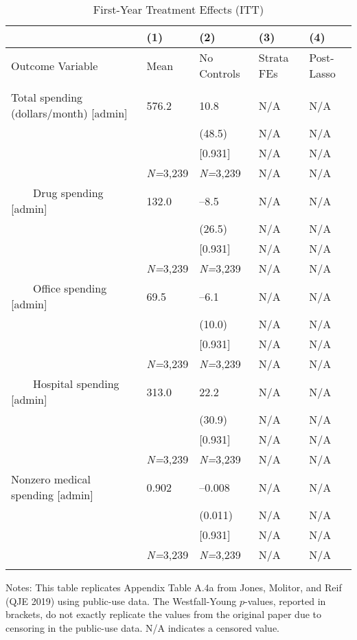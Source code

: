 \documentclass{article}
\begin{document}
\setlength{\tabcolsep}{6pt}
\begin{table}[tbp] \centering
{}

\caption{First-Year Treatment Effects (ITT)}
\label{tab:appendix_itt_spend_vars_admin_0816_0717}
{\scriptsize
\begin{tabularx}{\linewidth}{lCCCC}

\toprule
&{(1)}&{(2)}&{(3)}&{(4)} \tabularnewline \midrule
{Outcome Variable}&{Mean}&{No Controls}&{Strata FEs}&{Post-Lasso} \tabularnewline
\midrule 
\addlinespace[1.4ex]
 \tabularnewline
\midrule Total spending (dollars/month) [admin]&576.2&10.8&N/A&N/A \tabularnewline
&&(48.5)&N/A&N/A \tabularnewline
&&[0.931]&N/A&N/A \tabularnewline
&\textit{N=}3,239&\textit{N=}3,239&N/A&N/A \tabularnewline
\addlinespace[1.4ex]
\ \ \ \ Drug spending [admin]&132.0&--8.5&N/A&N/A \tabularnewline
&&(26.5)&N/A&N/A \tabularnewline
&&[0.931]&N/A&N/A \tabularnewline
&\textit{N=}3,239&\textit{N=}3,239&N/A&N/A \tabularnewline
\addlinespace[1.4ex]
\ \ \ \ Office spending [admin]&69.5&--6.1&N/A&N/A \tabularnewline
&&(10.0)&N/A&N/A \tabularnewline
&&[0.931]&N/A&N/A \tabularnewline
&\textit{N=}3,239&\textit{N=}3,239&N/A&N/A \tabularnewline
\addlinespace[1.4ex]
\ \ \ \ Hospital spending [admin]&313.0&22.2&N/A&N/A \tabularnewline
&&(30.9)&N/A&N/A \tabularnewline
&&[0.931]&N/A&N/A \tabularnewline
&\textit{N=}3,239&\textit{N=}3,239&N/A&N/A \tabularnewline
\addlinespace[1.4ex]
Nonzero medical spending [admin]&0.902&--0.008&N/A&N/A \tabularnewline
&&(0.011)&N/A&N/A \tabularnewline
&&[0.931]&N/A&N/A \tabularnewline
&\textit{N=}3,239&\textit{N=}3,239&N/A&N/A \tabularnewline
\bottomrule\addlinespace[-1.5ex] 

\end{tabularx}
\begin{flushleft}
\footnotesize Notes: This table replicates Appendix Table A.4a from Jones, Molitor, and Reif (QJE 2019) using public-use data. The Westfall-Young \(p\)-values, reported in brackets, do not exactly replicate the values from the original paper due to censoring in the public-use data. N/A indicates a censored value.
\end{flushleft}
}
\end{table}
\end{document}
